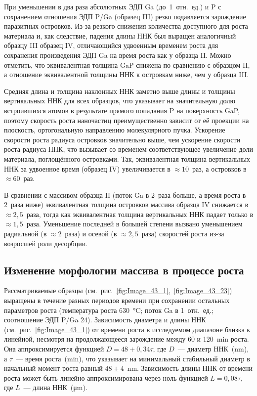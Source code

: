 При уменьшении в два раза абсолютных ЭДП Ga (до~1~отн.~ед.) и P с сохранением отношения ЭДП P/Ga (образeц III) резко подавляется зарождение паразитных островков. Из-за резкого снижения количества доступного для роста материала и, как следствие, падения длины ННК был выращен аналогичный образцу III образец IV, отличающийся удвоенным временем роста для сохранения произведения ЭДП Ga на время роста как у образца II. Можно отметить, что эквивалентная толщина GaP снижена по сравнению с образцом II, а отношение эквивалентной толщины ННК к островкам ниже, чем у образца III.

Средняя длина и толщина наклонных ННК заметно выше длины и толщины вертикальных ННК для всех образцов, что указывает на значительную долю встроившихся атомов в результате прямого попадания P на поверхность GaP, поэтому скорость роста наночастиц преимущественно зависит от её проекции на плоскость, ортогональную направлению молекулярного пучка. Ускорение скорости роста радиуса островков значительно выше, чем ускорение скорости роста радиуса ННК, что вызывает со временем соответствующее увеличение доли материала, поглощённого островками. Так, эквивалентная толщина вертикальных ННК за удвоенное время (образец IV) увеличивается в \(\approx 10\)~раз, а островков в \(\approx 60\)~раз.

В сравнении с массивом образца II (поток Ga в 2~раза больше, а время роста в 2~раза ниже) эквивалентная толщина островков массива образца IV снижается в \(\approx 2,5\)~раза, тогда как эквивалентная толщина вертикальных ННК падает только в \(\approx 1,5\)~раза. Уменьшение последней в большей степени вызвано уменьшением радиальной (в \(\approx 2\)~раза) и осевой (в \(\approx 2,5\)~раза) скоростей роста из-за возросшей роли десорбции.

\subsection{Изменение морфологии массива в процессе роста}\label{subsec:ch6/sec2/sub4}

Рассматриваемые образцы (см.~рис.~\cref{fig:Image_43_1},~\cref{fig:Image_43_23}) выращены в течение разных периодов времени при сохранении остальных параметров роста (температура роста 630~\si{\degreeCelsius}; поток Ga в 1~отн.~ед.; соотношение ЭДП P/Ga 24). Зависимость диаметра и длины ННК (см.~рис.~\cref{fig:Image_43_1}) от времени роста в исследуемом диапазоне близка к линейной, несмотря на продолжающееся зарождение между 60 и 120~\si{\minute} роста. Она аппроксимируется функцией \(D = 48 + 0,34 \tau\), где \(D\)~--- диаметр ННК~(\si{\nano\meter}), а \(\tau\)~--- время роста~(\si{\minute}), что указывает на минимальный стабильный диаметр в начальный момент роста равный \(48 \pm 4\)~\si{\nano\meter}. Зависимость длины ННК от времени роста может быть линейно аппроксимирована через ноль функцией \(L = 0,08 \tau\), где \(L\)~--- длина ННК~(\si{\micro\meter}).

